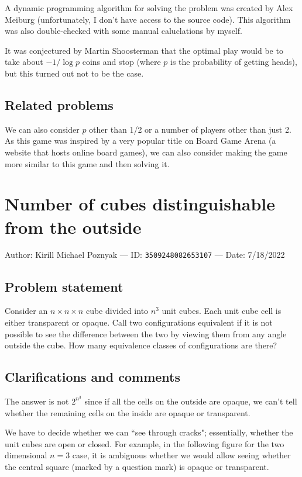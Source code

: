 \documentclass[10pt]{article}
\begin{document}
A dynamic programming algorithm for solving the problem was created by Alex Meiburg (unfortunately, I don't have access to the source code). This algorithm was also double-checked with some manual caluclations by myself.

It was conjectured by Martin Shoosterman that the optimal play would be to take about $-1/\log p$ coins and stop (where $p$ is the probability of getting heads), but this turned out not to be the case.

\subsection{Related problems}

We can also consider $p$ other than 1/2 or a number of players other than just 2. As this game was inspired by a very popular title on Board Game Arena (a website that hosts online board games), we can also consider making the game more similar to this game and then solving it.

\pagebreak

\section{Number of cubes distinguishable from the outside}

Author: Kirill Michael Poznyak --- ID: \verb`3509248082653107` --- Date: 7/18/2022

\subsection{Problem statement}

Consider an $n\times n\times n$ cube divided into $n^3$ unit cubes. Each unit cube cell is either transparent or opaque. Call two configurations equivalent if it is not possible to see the difference between the two by viewing them from any angle outside the cube. How many equivalence classes of configurations are there?

\subsection{Clarifications and comments}

The answer is not $2^{n^3}$ since if all the cells on the outside are opaque, we can't tell whether the remaining cells on the inside are opaque or transparent.

We have to decide whether we can ``see through cracks"; essentially, whether the unit cubes are open or closed. For example, in the following figure for the two dimensional $n=3$ case, it is ambiguous whether we would allow seeing whether the central square (marked by a question mark) is opaque or transparent.
\end{document}
